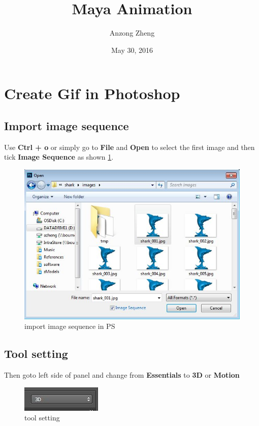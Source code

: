 \documentclass[10pt,a4paper]{article}
\begin{document}
\author{Anzong Zheng}
\title{Maya Animation}
\date{May 30, 2016}
\maketitle

\tableofcontents

\newpage

\section{Create Gif in Photoshop}
\subsection{Import image sequence}
Use \textbf{Ctrl + o} or simply go to \textbf{File} and \textbf{Open} to select the first image and then tick \textbf{Image Sequence} as shown \ref{fig:importImageSeq_inPS}.

\begin{figure}[h]
\centering
\includegraphics[scale=0.3]{importImageSeq_inPS}
\caption{import image sequence in PS}
\label{fig:importImageSeq_inPS}
\end{figure}

\subsection{Tool setting}
Then goto left side of panel and change from \textbf{Essentials} to \textbf{3D} or \textbf{Motion}

\begin{figure}[h]
\centering
\includegraphics[scale=0.5]{3d_PS}
\caption{tool setting}
\label{fig:3d_PS}
\end{figure}
\end{document}
